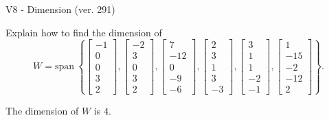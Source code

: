 \begin{exercise}
  \begin{exerciseTitle}V8 - Dimension (ver. 291)\end{exerciseTitle}
  \begin{exerciseStatement}
    Explain how to find the dimension of 
\[W=\mathrm{span}\ \left\{\left[\begin{array}{r}
-1 \\
0 \\
0 \\
3 \\
2
\end{array}\right] , \left[\begin{array}{r}
-2 \\
3 \\
0 \\
3 \\
2
\end{array}\right] , \left[\begin{array}{r}
7 \\
-12 \\
0 \\
-9 \\
-6
\end{array}\right] , \left[\begin{array}{r}
2 \\
3 \\
1 \\
3 \\
-3
\end{array}\right] , \left[\begin{array}{r}
3 \\
1 \\
1 \\
-2 \\
-1
\end{array}\right] , \left[\begin{array}{r}
1 \\
-15 \\
-2 \\
-12 \\
2
\end{array}\right]\right\}.\]



  \end{exerciseStatement}
  \begin{exerciseAnswer}
   The dimension of \(W\) is  \(4\).
  


  \end{exerciseAnswer}
\end{exercise}